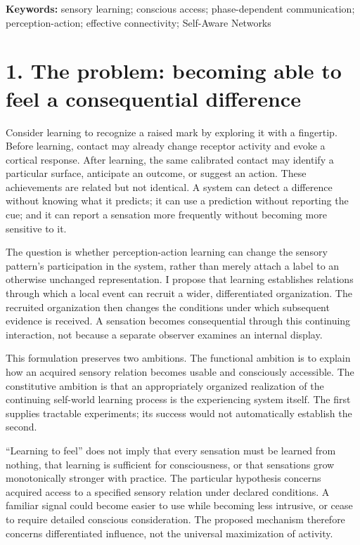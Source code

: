 \documentclass[
  american,
  11pt,
  letterpaper,
]{article}
\begin{document}
\textbf{Keywords:} sensory learning; conscious access; phase-dependent communication; perception-action; effective connectivity; Self-Aware Networks

\section{1. The problem: becoming able to feel a consequential difference}\label{the-problem-becoming-able-to-feel-a-consequential-difference}

Consider learning to recognize a raised mark by exploring it with a fingertip. Before learning, contact may already change receptor activity and evoke a cortical response. After learning, the same calibrated contact may identify a particular surface, anticipate an outcome, or suggest an action. These achievements are related but not identical. A system can detect a difference without knowing what it predicts; it can use a prediction without reporting the cue; and it can report a sensation more frequently without becoming more sensitive to it.

The question is whether perception-action learning can change the sensory pattern's participation in the system, rather than merely attach a label to an otherwise unchanged representation. I propose that learning establishes relations through which a local event can recruit a wider, differentiated organization. The recruited organization then changes the conditions under which subsequent evidence is received. A sensation becomes consequential through this continuing interaction, not because a separate observer examines an internal display.

This formulation preserves two ambitions. The functional ambition is to explain how an acquired sensory relation becomes usable and consciously accessible. The constitutive ambition is that an appropriately organized realization of the continuing self-world learning process is the experiencing system itself. The first supplies tractable experiments; its success would not automatically establish the second.

``Learning to feel'' does not imply that every sensation must be learned from nothing, that learning is sufficient for consciousness, or that sensations grow monotonically stronger with practice. The particular hypothesis concerns acquired access to a specified sensory relation under declared conditions. A familiar signal could become easier to use while becoming less intrusive, or cease to require detailed conscious consideration. The proposed mechanism therefore concerns differentiated influence, not the universal maximization of activity.
\end{document}
